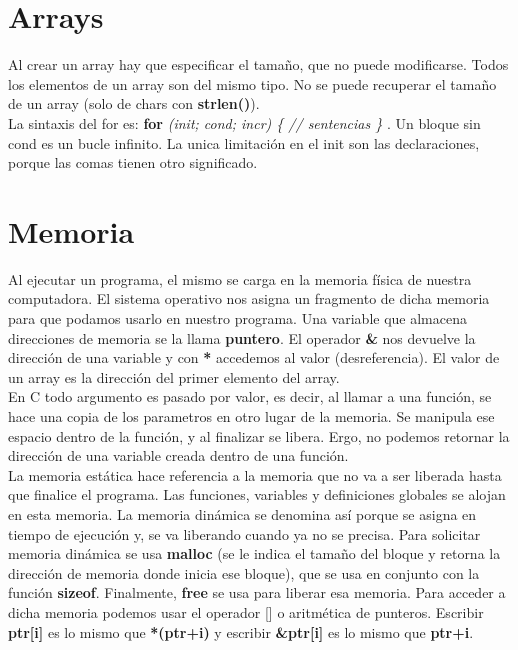 \documentclass[11pt,a4paper]{article}
\begin{document}
\section{Arrays}
Al crear un array hay que especificar el tamaño, que no puede modificarse. Todos los elementos de un array son del mismo tipo. No se puede recuperar el tamaño de un array (solo de chars con \textbf{strlen()}).\\

La sintaxis del for es: \textbf{for} \textit{ (init; cond; incr) \{ // sentencias \} }. Un bloque sin cond es un bucle infinito. La unica limitaci\'on en el init son las declaraciones, porque las comas tienen otro significado.

\section{Memoria}
Al ejecutar un programa, el mismo se carga en la memoria física de nuestra computadora. El sistema operativo nos asigna un fragmento de dicha memoria para que podamos usarlo en nuestro programa. Una variable que almacena direcciones de memoria se la llama \textbf{puntero}. El operador \textbf{\&} nos devuelve la direcci\'on de una variable y con \textbf{*} accedemos al valor (desreferencia). El valor de un array es la direcci\'on del primer elemento del array.\\

En C todo argumento es pasado por valor, es decir, al llamar a una funci\'on, se hace una copia de los parametros en otro lugar de la memoria. Se manipula ese espacio dentro de la funci\'on, y al finalizar se libera. Ergo, no podemos retornar la direcci\'on de una variable creada dentro de una funci\'on.\\

La memoria estática hace referencia a la memoria que no va a ser liberada hasta que finalice el programa. Las funciones, variables y definiciones globales se alojan en esta memoria. La memoria dinámica se denomina así porque se asigna en tiempo de ejecución y, se va liberando cuando ya no se precisa. Para solicitar memoria din\'amica se usa \textbf{malloc} (se le indica el tamaño del bloque y retorna la dirección de memoria donde inicia ese bloque), que se usa en conjunto con la funci\'on \textbf{sizeof}. Finalmente, \textbf{free} se usa para liberar esa memoria. Para acceder a dicha memoria podemos usar el operador [] o aritm\'etica de punteros. Escribir \textbf{ptr[i]} es lo mismo que \textbf{*(ptr+i)} y escribir \textbf{\&ptr[i]} es lo mismo que \textbf{ptr+i}.
\end{document}
